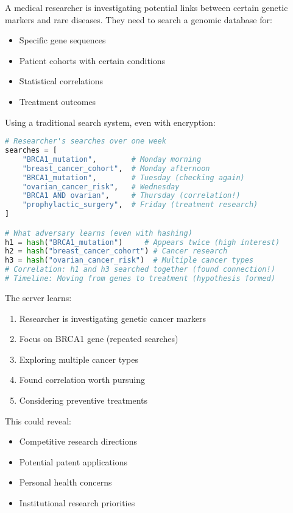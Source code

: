 \begin{example}
A medical researcher is investigating potential links between certain genetic markers and rare diseases. They need to search a genomic database for:
\begin{itemize}
\item Specific gene sequences
\item Patient cohorts with certain conditions
\item Statistical correlations
\item Treatment outcomes
\end{itemize}

Using a traditional search system, even with encryption:
\begin{lstlisting}[language=Python]
# Researcher's searches over one week
searches = [
    "BRCA1_mutation",        # Monday morning
    "breast_cancer_cohort",  # Monday afternoon
    "BRCA1_mutation",        # Tuesday (checking again)
    "ovarian_cancer_risk",   # Wednesday
    "BRCA1 AND ovarian",     # Thursday (correlation!)
    "prophylactic_surgery",  # Friday (treatment research)
]

# What adversary learns (even with hashing)
h1 = hash("BRCA1_mutation")     # Appears twice (high interest)
h2 = hash("breast_cancer_cohort") # Cancer research
h3 = hash("ovarian_cancer_risk")  # Multiple cancer types
# Correlation: h1 and h3 searched together (found connection!)
# Timeline: Moving from genes to treatment (hypothesis formed)
\end{lstlisting}

The server learns:
\begin{enumerate}
\item Researcher is investigating genetic cancer markers
\item Focus on BRCA1 gene (repeated searches)
\item Exploring multiple cancer types
\item Found correlation worth pursuing
\item Considering preventive treatments
\end{enumerate}

This could reveal:
\begin{itemize}
\item Competitive research directions
\item Potential patent applications
\item Personal health concerns
\item Institutional research priorities
\end{itemize}
\end{example}

